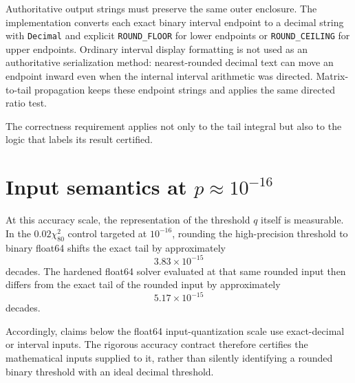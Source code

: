 Authoritative output strings must preserve the same outer enclosure.  The
implementation converts each exact binary interval endpoint to a decimal
string with \texttt{Decimal} and explicit \texttt{ROUND\_FLOOR} for lower
endpoints or \texttt{ROUND\_CEILING} for upper endpoints.  Ordinary interval
display formatting is not used as an authoritative serialization method:
nearest-rounded decimal text can move an endpoint inward even when the
internal interval arithmetic was directed.  Matrix-to-tail propagation keeps
these endpoint strings and applies the same directed ratio test.

The correctness requirement applies not only to the tail integral but also
to the logic that labels its result certified.

\section{Input semantics at \texorpdfstring{\(p\approx10^{-16}\)}{p about 1e-16}}

At this accuracy scale, the representation of the threshold \(q\) itself is
measurable.  In the \(0.02\chi^2_{80}\) control targeted at \(10^{-16}\),
rounding the high-precision threshold to binary float64 shifts the exact tail
by approximately
\[
3.83\times10^{-15}
\]
decades.  The hardened float64 solver evaluated at that same rounded input
then differs from the exact tail of the rounded input by approximately
\[
5.17\times10^{-15}
\]
decades.

Accordingly, claims below the float64 input-quantization scale use exact-decimal
or interval inputs.  The rigorous accuracy contract therefore certifies the
mathematical inputs supplied to it, rather than silently identifying a rounded
binary threshold with an ideal decimal threshold.



